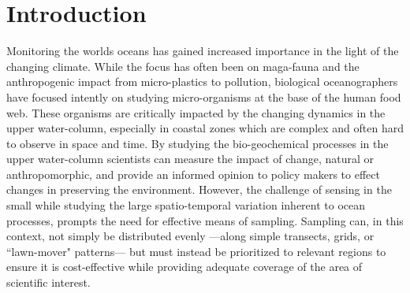 \documentclass[aoas]{imsart}
\begin{document}
\begin{frontmatter}
\begin{abstract}
\end{abstract}


\begin{keyword}
\end{keyword}

\end{frontmatter}

\section{Introduction}

Monitoring the worlds oceans has gained increased importance in the
light of the changing climate. While the focus has often been on
maga-fauna and the anthropogenic impact from micro-plastics to
pollution, biological oceanographers have focused intently on studying
micro-organisms at the base of the human food web. These organisms are
critically impacted by the changing dynamics in the upper water-column,
especially in coastal zones which are complex and often hard to observe
in space and time. By studying the bio-geochemical processes in the
upper water-column scientists can measure the impact of change, natural
or anthropomorphic, and provide an informed opinion to policy makers to
effect changes in preserving the environment. However, the challenge of 
sensing in the small%
while studying the large spatio-temporal variation inherent to ocean
processes, prompts the need for effective means of sampling.
Sampling can, in this context, not simply be distributed evenly
---along simple transects, grids, or ``lawn-mover" patterns--- but must
instead be prioritized to relevant regions to ensure it is
cost-effective while providing adequate coverage of the area of
scientific interest.
\end{document}
